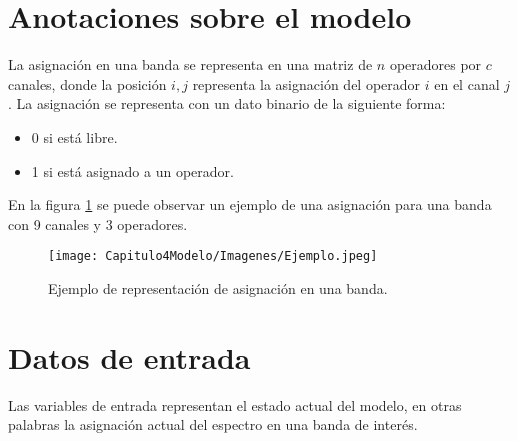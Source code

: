 
\section{Anotaciones sobre el modelo}

La asignación en una banda se representa en una matriz de $n$ operadores por $c$ canales, donde la posición $i,j$ representa la asignación del operador $i$ en el canal $j$. La asignación se representa con un dato binario de la siguiente forma:

\begin{itemize}
	\item 0 si está libre.
	\item 1 si está asignado a un operador.
\end{itemize}

En la figura \ref{fig:ejemploAsignacion} se puede observar un ejemplo de una asignación para una banda con 9 canales y 3 operadores.

\begin{figure}[H]
	\centering
	\texttt{[image: Capitulo4Modelo/Imagenes/Ejemplo.jpeg]}
	\caption{Ejemplo de representación de asignación en una banda.}
	\label{fig:ejemploAsignacion}	
\end{figure}



\section{Datos de entrada}

Las variables de entrada representan el estado actual del modelo, en otras palabras la asignación actual del espectro en una banda de interés.


